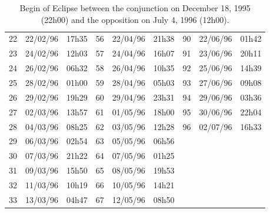 \documentclass{tufte-handout}
\begin{document}
\begin{table}
\begin{tabular}{lll|lll|lll}
22 & 22/02/96 & 17h35 & 56 & 22/04/96 & 21h38 & 90 & 22/06/96 & 01h42\\
23 & 24/02/96 & 12h03 & 57 & 24/04/96 & 16h07 & 91 & 23/06/96 & 20h11\\
24 & 26/02/96 & 06h32 & 58 & 26/04/96 & 10h35 & 92 & 25/06/96 & 14h39\\
25 & 28/02/96 & 01h00 & 59 & 28/04/96 & 05h03 & 93 & 27/06/96 & 09h08\\
26 & 29/02/96 & 19h29 & 60 & 29/04/96 & 23h31 & 94 & 29/06/96 & 03h36\\
27 & 02/03/96 & 13h57 & 61 & 01/05/96 & 18h00 & 95 & 30/06/96 & 22h04\\
28 & 04/03/96 & 08h25 & 62 & 03/05/96 & 12h28 & 96 & 02/07/96 & 16h33\\
29 & 06/03/96 & 02h54 & 63 & 05/05/96 & 06h56 & & &\\
30 & 07/03/96 & 21h22 & 64 & 07/05/96 & 01h25 & & &\\
31 & 09/03/96 & 15h50 & 65 & 08/05/96 & 19h53 & & & \\
32 & 11/03/96 & 10h19 & 66 & 10/05/96 & 14h21 & & &\\
33 & 13/03/96 & 04h47 & 67 & 12/05/96 & 08h50 & & &\\
\end{tabular}
\caption{Begin of Eclipse between the conjunction on December 18, 1995 (22h00) and the opposition on July 4, 1996 (12h00).}
\end{table}
\end{document}
